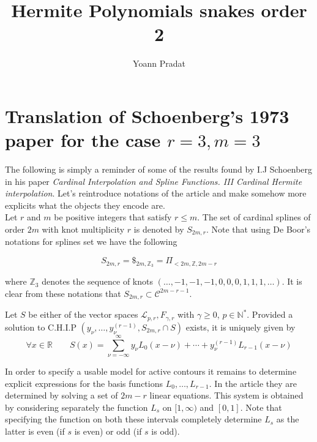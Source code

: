 \documentclass[a4paper, 11pt]{article}
\begin{document}
\title{Hermite Polynomials snakes order 2}
\author{Yoann Pradat}
\maketitle

\section{Translation of Schoenberg's 1973 paper for the case $r=3, m=3$}

The following is simply a reminder of some of the results found by I.J Schoenberg in his paper \emph{Cardinal 
Interpolation and Spline Functions. III Cardinal Hermite interpolation}. Let's reintroduce notations of the article and 
make somehow more explicits what the objects they encode are. \\

Let $r$ and $m$ be positive integers that satisfy $r \leq m$. The set of cardinal splines of order $2m$ with knot 
multiplicity $r$ is denoted by $S_{2m,r}$. Note that using De Boor's notations for splines set we have the following

\begin{equation}
  S_{2m,r} = \$_{2m, \mathbb{Z}_3} = \Pi_{< 2m, \mathbb{Z}, 2m-r}
\end{equation}

where $\mathbb{Z}_{3}$ denotes the sequence of knots $(\dots, -1,-1,-1, 0, 0, 0, 1, 1, 1, \dots)$. It is clear from 
these notations that $S_{2m, r} \subset \mathcal{C}^{2m-r-1}$. 

\begin{thm}{1}
  Let $S$ be either of the vector spaces $\mathcal{L}_{p,r}, F_{\gamma,r}$ with $\gamma \geq 0$, $p \in \mathbb{N}^*$.  
  Provided a solution to C.H.I.P $\left( y_{\nu}, \dots,  y_{\nu}^{(r-1)}, S_{2m,r} \cap S \right)$ exists, it is 
  uniquely given by
  \begin{equation}
    \forall x \in \mathbb{R} \qquad S(x) = \sum_{\nu = - \infty}^{\infty} y_{\nu} L_0(x-\nu) + \cdots + y_{\nu}^{(r-1)} 
    L_{r-1}(x-\nu)
  \end{equation}
\end{thm}

In order to specify a usable model for active contours it remains to determine explicit expressions for the basis 
functions $L_0, \dots, L_{r-1}$. In the article they are determined by solving a set of $2m-r$ linear equations. This 
system is obtained by considering separately the function $L_s$ on $[1, \infty)$ and $[0,1]$. Note that specifying the 
function on both these intervals completely determine $L_s$ as the latter is even (if $s$ is even) or odd (if $s$ is 
odd). \\  
\end{document}
